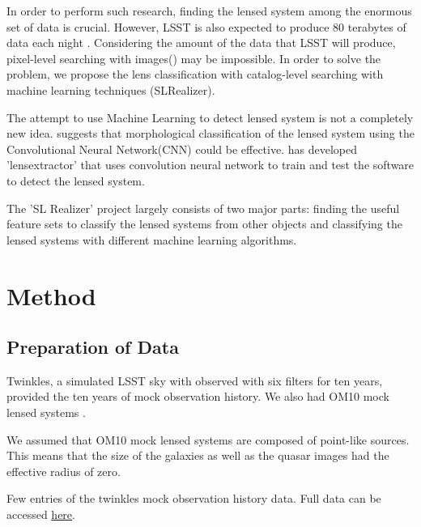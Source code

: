 \documentclass[\docopts]{\docclass}
\begin{document}
In order to perform such research, finding the lensed system among the enormous set of data is crucial. However, LSST is also expected to produce 80 terabytes of data each night \cite{LSSTScienceBookv2}.
Considering the amount of the data that LSST will produce, pixel-level searching with images(\cite{RINGFINDER}) may be impossible. In order to solve the problem, we propose the lens classification with catalog-level searching with machine learning techniques (SLRealizer). 

The attempt to use Machine Learning to detect lensed system is not a completely new idea. \citep{convolution_neural_network} suggests that morphological classification of the lensed system using the Convolutional Neural Network(CNN) could be effective. \citep{LensExtractor} has developed 'lensextractor' that uses convolution neural network to train and test the software to detect the lensed system.

The 'SL Realizer' project largely consists of two major parts: finding the useful feature sets to classify the lensed systems from other objects and classifying the lensed systems with different machine learning algorithms.  



\section{Method}
\label{sec:method}

\subsection{Preparation of Data}
\label{subsec:dataprep}

Twinkles, a simulated LSST sky with observed with six filters for ten years, provided the ten years of mock observation history. We also had OM10 mock lensed systems \cite{TimeDelayOverall}. 

We assumed that OM10 mock lensed systems are composed of point-like sources. This means that the size of the galaxies as well as the quasar images had the effective radius of zero.

\begin{table}[!h]
\caption{Few entries of the twinkles mock observation history data. Full data can be accessed \href{https://github.com/jennykim1016/SLRealizer/blob/master/data/twinkles_observation_history.csv}{here}.}
\end{table}
\end{document}
